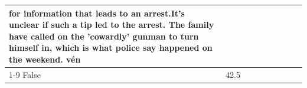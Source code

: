 \begin{table}[H]
\begin{tabular}{lllrlllll}
for information that leads to an arrest.It's unclear if such a tip led to the arrest. The family have called on the 'cowardly' gunman to turn himself in, which is what police say happened on the weekend. vén \\
\cline{1-9}
False & 42.5%
\end{tabular}
\end{table}
